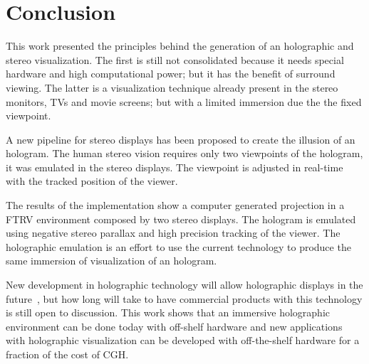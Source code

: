 \section{Conclusion}
\label{sec.conclusion}

This work presented the principles behind the generation of an holographic and stereo visualization. The first is still not consolidated because it needs special hardware and high computational power; but it has the benefit of surround viewing. The latter is a visualization technique already present in the stereo monitors, TVs and movie screens; but with a limited immersion due the the fixed viewpoint.

A new pipeline for stereo displays has been proposed to create the illusion of an hologram. The human stereo vision requires only two viewpoints of the hologram, it was emulated in the stereo displays. The viewpoint is adjusted in real-time with the tracked position of the viewer.

The results of the implementation show a computer generated projection in a FTRV environment composed by two stereo displays. The hologram is emulated using negative stereo parallax and high precision tracking of the viewer. The holographic emulation is an effort to use the current technology to produce the same immersion of visualization of an hologram. 

New development in holographic technology will allow holographic displays in the future~\cite{Lucente2012}, but how long will take to have commercial products with this technology is still open to discussion. This work shows that an immersive holographic environment can be done today with off-shelf hardware and new applications with holographic visualization can be developed with off-the-shelf hardware for a fraction of the cost of CGH.

